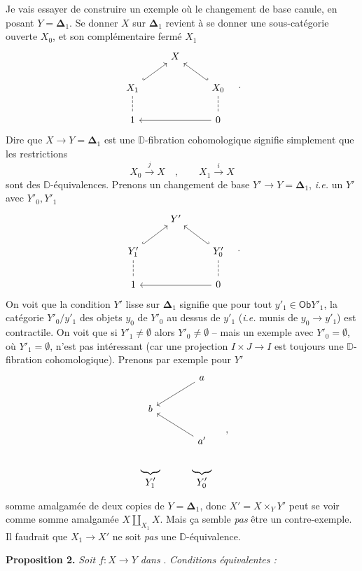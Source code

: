 \documentclass[11pt,leqno]{article}
\newcommand{\printedpage}[1]{\marginpar{\footnotesize p.~#1}}
\newcommand{\msp}[1]{\marginpar{\footnotesize [#1]}}
\newcommand{\Dia}{\mathsf{Dia}}
\newcommand{\Ob}{\mathsf{Ob}}
\newcommand{\D}{\mathbb{D}}
\begin{document}
\hspace*{\parindent}Je vais essayer de construire un exemple où le changement de base canule, en posant $Y = \boldsymbol{\Delta}_1$. Se donner $X$ sur $\boldsymbol{\Delta}_1$ revient à se donner une sous-catégorie ouverte $X_0$, et son complémentaire fermé $X_1$
\[
\begin{tikzcd}
& X & \\
X_1 \arrow[ur, hook] \arrow[d, dash, dashed] & & X_0 \arrow[ul, hook'] \arrow[d, dash, dashed] \\
1 & & 0 \arrow[ll]
\end{tikzcd}
\quad .
\]
Dire que $X \to Y = \boldsymbol{\Delta}_1$ est une $\D$-fibration cohomologique signifie simplement
\msp{page 78}
que les restrictions
\[
X_0 \overset{j}{\longrightarrow} X \quad , \qquad X_1 \overset{i}{\longrightarrow} X
\]
sont des $\D$-équivalences. Prenons un changement de base $Y' \to Y = \boldsymbol{\Delta}_1$, \textit{i.e.} un $Y'$ avec $Y'_0, Y'_1$
\[
\begin{tikzcd}
& Y' & \\
Y'_1 \arrow[ur, hook] \arrow[d, dash, dashed] & & Y'_0 \arrow[ul, hook'] \arrow[d, dash, dashed] \\
1 & & 0 \arrow[ll]
\end{tikzcd}
\quad .
\]
On voit que la condition $Y'$ lisse sur $\boldsymbol{\Delta}_1$ signifie que pour tout $y'_1 \in \Ob Y'_1$, la catégorie $Y'_0/y'_1$ des objets $y_0$ de $Y'_0$ au dessus de $y'_1$ (\textit{i.e.} munis de $y_0 \to y'_1$) est contractile. On voit que si $Y'_1 \neq \emptyset$ alors $Y'_0 \neq \emptyset$ -- mais un exemple avec $Y'_0 = \emptyset$, où $Y'_1 = \emptyset$, n'est pas intéressant
\printedpage{48}
(car une projection $I \times J \to I$ est toujours une $\D$-fibration cohomologique). Prenons par exemple pour $Y'$
\[
\begin{tikzcd}
& a \arrow[dl] \\
b & \\
& a' \arrow[ul] \\
\underbrace{\qquad}_{\displaystyle Y'_1} & \underbrace{\qquad}_{\displaystyle Y'_0}
\end{tikzcd}
\quad ,
\]
somme amalgamée de deux copies de $Y = \boldsymbol{\Delta}_1$, donc $X' = X \times_Y Y'$ peut se voir comme somme amalgamée $X \amalg_{X_1} X$. Mais ça semble \textit{pas} être un contre-exemple. Il faudrait que $X_1 \to X'$ ne soit \textit{pas} une $\D$-équivalence.

\msp{page 79}

\textbf{Proposition 2.} \textit{Soit $f : X \to Y$ dans} \Dia. \textit{Conditions équivalentes :}
\end{document}
